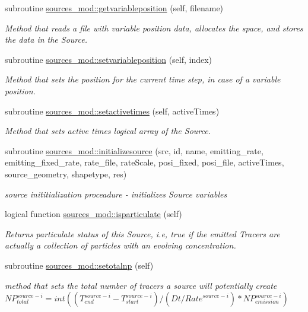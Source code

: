 \begin{DoxyCompactItemize}
subroutine \mbox{\hyperlink{namespacesources__mod_a1d419dd3048cff4cba05de4dd05b6556}{sources\+\_\+mod\+::getvariableposition}} (self, filename)
\begin{DoxyCompactList}\small\item\em Method that reads a file with variable position data, allocates the space, and stores the data in the Source. \end{DoxyCompactList}\item 
subroutine \mbox{\hyperlink{namespacesources__mod_ace7df80935a9daf416ecebad865f6b69}{sources\+\_\+mod\+::setvariableposition}} (self, index)
\begin{DoxyCompactList}\small\item\em Method that sets the position for the current time step, in case of a variable position. \end{DoxyCompactList}\item 
subroutine \mbox{\hyperlink{namespacesources__mod_af1e3a9c32dc0c7dbea57d1b05183a696}{sources\+\_\+mod\+::setactivetimes}} (self, active\+Times)
\begin{DoxyCompactList}\small\item\em Method that sets active times logical array of the Source. \end{DoxyCompactList}\item 
subroutine \mbox{\hyperlink{namespacesources__mod_abbddcd8606c9bf9463ffe6eaf1e9cbfd}{sources\+\_\+mod\+::initializesource}} (src, id, name, emitting\+\_\+rate, emitting\+\_\+fixed\+\_\+rate, rate\+\_\+file, rate\+Scale, posi\+\_\+fixed, posi\+\_\+file, active\+Times, source\+\_\+geometry, shapetype, res)
\begin{DoxyCompactList}\small\item\em source inititialization proceadure -\/ initializes Source variables \end{DoxyCompactList}\item 
logical function \mbox{\hyperlink{namespacesources__mod_ac4e4f33da78d030e1b56a48789da6a05}{sources\+\_\+mod\+::isparticulate}} (self)
\begin{DoxyCompactList}\small\item\em Returns particulate status of this Source, i.\+e, true if the emitted Tracers are actually a collection of particles with an evolving concentration. \end{DoxyCompactList}\item 
subroutine \mbox{\hyperlink{namespacesources__mod_a9a62c41b71d2d6ad85def74087542ef5}{sources\+\_\+mod\+::setotalnp}} (self)
\begin{DoxyCompactList}\small\item\em method that sets the total number of tracers a source will potentially create ${NP}_{total}^{source-i}=int((T_{end}^{source-i}-T_{start}^{source-i})/(Dt/{Rate}^{source-i})*{NP}_{emission}^{source-i})$ \end{DoxyCompactList}\item 

\end{DoxyCompactItemize}
